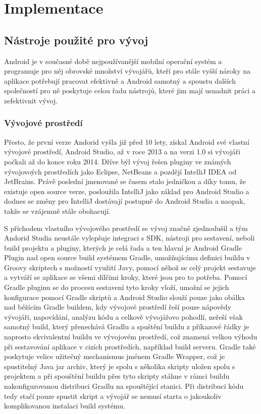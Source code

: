 \documentclass{article}
\begin{document}
\section{Implementace}

\subsection{Nástroje použité pro vývoj}
Android je v současné době nejpoužívanější mobilní operační systém a programuje pro něj obrovské
množství vývojářů, kteří pro stále vyšší nároky na aplikace potřebují pracovat efektivně a Android samotný
a spoustu dalších společností pro ně poskytuje celou řadu nástrojů, které jim mají usnadnit práci a zefektivnit vývoj.

\subsubsection{Vývojové prostředí}
Přesto, že první verze Andorid vyšla již před 10 lety, získal Android své vlastní vývojové prostředí, Android Studio,
až v roce 2013 a na verzi 1.0 si vývojáři počkali až do konce roku 2014. Dříve býl vývoj řešen pluginy ve známých
vývojovoých prostředích jako Eclipse, NetBeans a pozdějí IntelliJ IDEA od JetBrains. Právě poslední jmenované
se časem stalo jedničkou a díky tomu, že existuje open source verze, posloužila IntelliJ jako základ pro Android Studio
a dodnes se změny pro IntelliJ dostávají postupně do Android Studia a naopak, takže se vzájemně stále obohacují.

S příchodem vlastního vývojového prostředí se vývoj značně zjednodušil a tým Andorid Studia neustále vylepšuje integraci s SDK,
nástroji pro sestavení, neboli build projektu a pluginy, kterých je celá řada a ten hlavní je Android Gradle Plugin
nad open source build systémem Gradle, umožňujícímu definici buildu v Groovy skriptech s možností využití Javy,
 pomocí něhož se celý projekt sestavuje a vytváří se aplikace se všemi dílčími kroky, které jsou pro to potřeba.
Pomocí Gradle pluginu se do procesu sestavení tyto kroky vloží, umožní se jejich konfigurace pomocí Gradle skriptů
a Android Studio slouží pouze jako obálka nad běžícím Gradle buildem, kdy vývojové prostředí řeší pouze nápovědy vývojáři,
napovídání, analýzu kódu a celkově vývojářovo pohodlí, neřeší však samotný build, který přenechává Gradlu a spuštění buildu
 z příkazové řádky je naprosto ekvivalentní buildu ve vývojovém prostředí, což znamená velkou výhodu při sestavování aplikace
 v cizích prostředích, například build serveru.
 Gradle také poskytuje velice užitečný mechanismus jménem Gradle Wrapper, což je spustitelný Java jar archiv,
 který je spolu s několika skripty uložen spolu s projektem a při spouštění buildu přes tyto skripty stáhne v rámci
 buildu nakonfigurovanou distribuci Gradlu na spouštějící stanici. Při distribuci kódu tedy stačí pouze spustit
 skript a vývojář se nemusí starta o jakoukoliv komplikovanou instalaci build systému.
\end{document}
